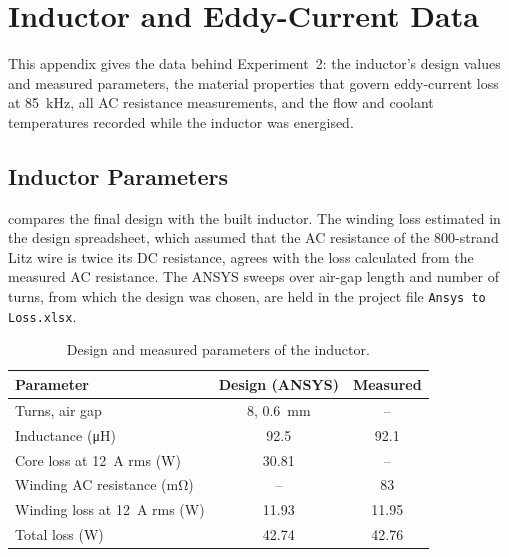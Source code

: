 \chapter{Inductor and Eddy-Current Data}
\label{app:inductor-data}

This appendix gives the data behind Experiment~2: the inductor's design values
and measured parameters, the material properties that govern eddy-current loss
at \SI{85}{\kilo\hertz}, all AC resistance measurements, and the flow and coolant
temperatures recorded while the inductor was energised.

\section{Inductor Parameters}

 compares the final design with the built inductor. The
winding loss estimated in the design spreadsheet, which assumed that the AC
resistance of the 800-strand Litz wire is twice its DC resistance, agrees with the
loss calculated from the measured AC resistance. The ANSYS sweeps over air-gap
length and number of turns, from which the design was chosen, are held in the
project file \texttt{Ansys to Loss.xlsx}.

\begin{table}[htbp]
  \centering
  \caption{Design and measured parameters of the inductor.}
  \label{tab:app-inductor}
  \small
  \begin{tabular}{@{}lcc@{}}
    \toprule
    Parameter & Design (ANSYS) & Measured \\
    \midrule
    Turns, air gap & 8, \SI{0.6}{\milli\metre} & -- \\
    Inductance (\si{\micro\henry}) & 92.5 & 92.1 \\
    Core loss at \SI{12}{\ampere} rms (\si{\watt}) & 30.81 & -- \\
    Winding AC resistance (\si{\milli\ohm}) & -- & 83 \\
    Winding loss at \SI{12}{\ampere} rms (\si{\watt}) & 11.93 & 11.95 \\
    Total loss (\si{\watt}) & 42.74 & 42.76\tnote{a} \\
    \bottomrule
  \end{tabular}
\end{table}

